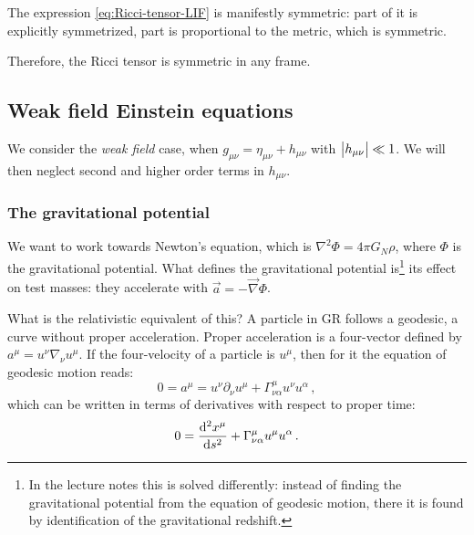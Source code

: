 \documentclass[main.tex]{subfiles}
\begin{document}
The expression \eqref{eq:Ricci-tensor-LIF} is manifestly symmetric: part of it is explicitly symmetrized, part is proportional to the metric, which is symmetric.

Therefore, the Ricci tensor is symmetric in any frame.

\subsection{Weak field Einstein equations}

We consider the \emph{weak field} case, when \(g_{\mu \nu }= \eta_{\mu \nu } + h_{\mu \nu }\) with \(\abs{h_{\mu \nu }} \ll 1 \). We will then neglect second and higher order terms in \(h_{\mu \nu }\).

\subsubsection{The gravitational potential}

We want to work towards Newton's equation, which is \(\nabla^2 \Phi = 4 \pi G_N \rho \), where \(\Phi \) is the gravitational potential.
What defines the gravitational potential is\footnote{In the lecture notes this is solved differently: instead of finding the gravitational potential from the equation of geodesic motion, there it is found by identification of the gravitational redshift.} its effect on test masses: they accelerate with \(\vec{a} = - \vec{\nabla} \Phi \).

What is the relativistic equivalent of this?
A particle in GR follows a geodesic, a curve without proper acceleration.
Proper acceleration is a four-vector defined by \(a^{\mu }=u^{\nu }\nabla_{\nu } u^{\mu }\). If the four-velocity of a particle is \(u^{\mu }\), then for it the equation of geodesic motion reads: 
%
\begin{equation}
  0 = a^{\mu }= u^{\nu }\partial_{\nu }u^{\mu } + \Gamma^{\mu }_{\nu \alpha }u^{\nu} u^{\alpha }
\,,
\end{equation}
%
which can be written in terms of derivatives with respect to proper time: 
%
\begin{equation}
  0 = \dv[2]{x^{ \mu }}{s} + \Gamma^{\mu }_{\nu \alpha } u^{\mu } u^{\alpha }
\,.
\end{equation}
\end{document}
